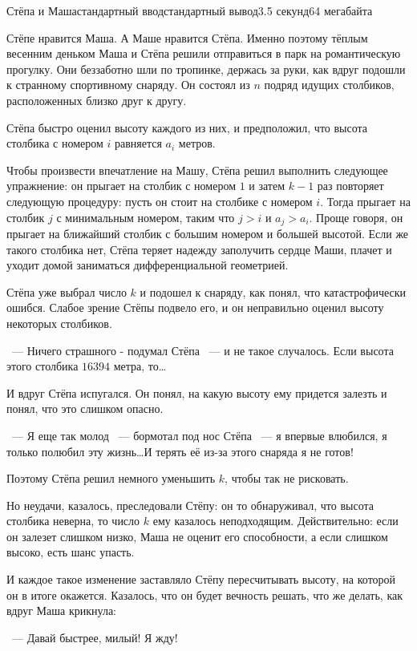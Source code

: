 \begin{problem}{Стёпа и Маша}{стандартный ввод}{стандартный вывод}{3.5 секунд}{64 мегабайта}

Стёпе нравится Маша. А Маше нравится Стёпа. Именно поэтому тёплым весенним деньком Маша и Стёпа решили отправиться в парк на романтическую прогулку. Они беззаботно шли по тропинке, держась за руки, как вдруг подошли к странному спортивному снаряду. Он состоял из $n$ подряд идущих столбиков, расположенных близко друг к другу.

Стёпа быстро оценил высоту каждого из них, и предположил, что высота столбика с номером $i$ равняется $a_i$ метров.

Чтобы произвести впечатление на Машу, Стёпа решил выполнить следующее упражнение: он прыгает на столбик с номером $1$ и затем $k - 1$ раз повторяет следующую процедуру: пусть он стоит на столбике с номером $i$. Тогда прыгает на столбик $j$ с минимальным номером, таким что $j > i$ и $a_{j} > a_{i}$. Проще говоря, он прыгает на ближайший столбик с большим номером и большей высотой. Если же такого столбика нет, Стёпа теряет надежду заполучить сердце Маши, плачет и уходит домой заниматься дифференциальной геометрией.

Стёпа уже выбрал число $k$ и подошел к снаряду, как понял, что катастрофически ошибся. Слабое зрение Стёпы подвело его, и он неправильно оценил высоту некоторых столбиков.

~--- Ничего страшного - подумал Стёпа ~--- и не такое случалось. Если высота этого столбика $16394$ метра, то\ldots

И вдруг Стёпа испугался. Он понял, на какую высоту ему придется залезть и понял, что это слишком опасно.

~--- Я еще так молод ~--- бормотал под нос Стёпа ~--- я впервые влюбился, я только полюбил эту жизнь\ldots И терять её из-за этого снаряда я не готов!

Поэтому Стёпа решил немного уменьшить $k$, чтобы так не рисковать.

Но неудачи, казалось, преследовали Стёпу: он то обнаруживал, что высота столбика неверна, то число $k$ ему казалось неподходящим. Действительно: если он залезет слишком низко, Маша не оценит его способности, а если слишком высоко, есть шанс упасть.

И каждое такое изменение заставляло Стёпу пересчитывать высоту, на которой он в итоге окажется. Казалось, что он будет вечность решать, что же делать, как вдруг Маша крикнула:

~--- Давай быстрее, милый! Я жду!


\end{problem}
